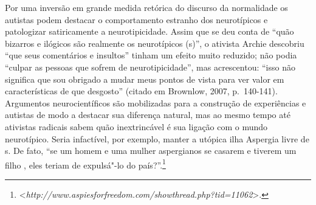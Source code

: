 Por uma inversão em grande medida retórica do discurso da normalidade os
autistas podem destacar o comportamento estranho dos neurotípicos e
patologizar satiricamente a neurotipicidade. Assim que se deu conta de
``quão bizarros e ilógicos são realmente os neurotípicos (s)'', o
ativista Archie descobriu ``que seus comentários e insultos'' tinham um
efeito muito reduzido; não podia ``culpar as pessoas que sofrem de
neurotipicidade'', mas acrescentou: ``isso não significa que sou
obrigado a mudar meus pontos de vista para ver valor em características
de que desgosto'' (citado em Brownlow, 2007, p.~140-141). Argumentos
neurocientíficos são mobilizadas para a construção de experiências  e
autistas de modo a destacar sua diferença natural, mas ao mesmo tempo
até ativistas radicais sabem quão inextrincável é sua ligação com o
mundo neurotípico. Seria infactível, por exemplo, manter a utópica ilha
Aspergia livre de s. De fato, ``se um homem e uma mulher aspergianos
se casarem e tiverem um filho , eles teriam de expulsá"-lo do
país?''.\footnote[28]{\textless{}\emph{http://www.aspiesforfreedom.com/showthread.php?tid=11062}\textgreater{}.}

